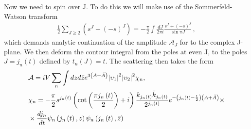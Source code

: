 \documentclass[12pt,a4paper]{article}
\begin{document}
Now we need to spin over J. To do this we will make use of the Sommerfeld-Watson transform
\begin{align}
    \frac{1}{2} \sum_{J \geq 2} \left( s^J + {(- s)}^J \right)= - \frac{\pi}{2} \int \frac{dJ}{2 \pi i} \frac{s^J + {(- s)}^J}{\sin \pi J}\,,
\end{align}
which demands analytic continuation of the amplitude $\mathcal{A}_J$ for to the complex J-plane. We then deform the contour integral from the poles at even J, to the poles $J = j_n (t)$ defined by $t_n(J) = t$. The scattering then takes the form
\begin{align}
& \mathcal{A} = i V \sum_n \int dz d\bar{z} e^{3\left(A + \bar{A}\right)} {\left| \upsilon_1 \right|}^2 {\left| \upsilon_2 \right|}^2 \chi_n, \\ \notag
& \chi_n = - \frac{\pi}{2} s^{j_n \left(t\right)} \left( \cot\left(\frac{\pi j_n \left(t\right)}{2}\right) + i\right) \frac{k_{j_n \left(t\right)}\bar{k}_{j_n \left(t\right)}}{2^{j_n \left(t\right)}} e^{-\left( j_n \left(t\right) - \frac{1}{2} \right)\left(A+\bar{A}\right)} \times \\
& \times \frac{d j_n}{d t} \psi_n \left(j_n \left(t\right), z \right)  \psi_n \left(j_n \left(t\right), \bar{z} \right)
\end{align}
\end{document}
